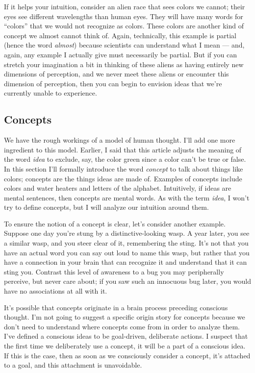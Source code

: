 \documentclass[11pt, oneside]{article}   	%
\begin{document}
If it helps your intuition, consider an alien race that sees colors we cannot;
their eyes see different wavelengths than human eyes.
They will have many words for ``colors''
that we would not recognize as colors. These colors are another kind of concept
we almost cannot think of.
Again, technically, this example is
partial (hence the word {\em almost})
because scientists can understand what I mean --- and, again, any
example I actually give must necessarily be partial. But if you can stretch your
imagination a bit in thinking of these aliens as having entirely new dimensions
of perception, and we never meet these aliens or encounter this dimension of
perception, then you can begin to envision ideas that we're currently
unable to experience.

\subsection{Concepts}\label{s_mental_words}

We have the rough workings of a model of human thought.
I'll add one more
ingredient to this model.
Earlier, I said that this article adjusts the meaning of the word
{\em idea} to exclude, say, the color green since a color
can't be true or false.
In this section I'll formally introduce the word {\em concept} to talk about
things like colors;
concepts are
the things ideas are made of.
Examples of concepts include
colors and water heaters and letters of the alphabet.
Intuitively, if
ideas are mental sentences, then
concepts are mental words.
As with the term {\em idea}, I won't try to define concepts,
but I will analyze our intuition around them.

To ensure the notion of a concept is clear, let's consider another example.
Suppose one day you're stung
by a distinctive-looking wasp.
A year later, you see a similar wasp, and you
steer clear of it, remembering the sting.
It's not that you have an actual word you can say out loud to name this wasp,
but rather that you have a connection in your brain that can recognize it and
understand that it can sting you.
Contrast this level of awareness to a bug you may peripherally perceive, but
never care about; if you saw such an innocuous bug later, you would have no
associations at all with it.

It's possible that concepts originate in a brain process preceding conscious
thought.
I'm not going to suggest a specific origin story for concepts
because we don't need to understand where concepts come from in
order to analyze them.
I've defined a conscious ideas to be goal-driven, deliberate actions.
I suspect that
the first time we deliberately use a concept, it will be a
part of a conscious idea.
If this is the case, then
as soon as we consciously consider a concept, it's attached
to a goal, and this attachment is unavoidable.
\end{document}
